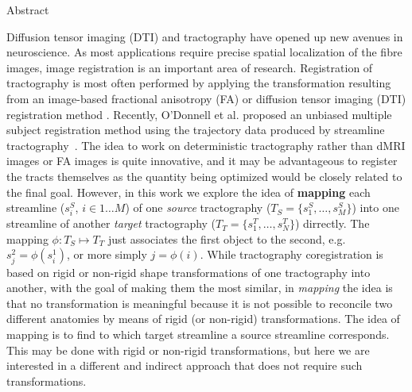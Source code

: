 Abstract

Diffusion tensor imaging (DTI) and tractography have opened up new avenues in neuroscience. As most applications require precise spatial localization of the fibre images, image registration is an important area of research. Registration of tractography is most often performed by applying the
transformation resulting from an image-based fractional anisotropy (FA) or diffusion
tensor imaging (DTI) registration method \cite{goodlett2009group, dan2011comparision, wang2011dti}. Recently, O’Donnell et al. proposed an
unbiased multiple subject registration method using the trajectory data produced by
streamline tractography~\cite{odonnell2012unbiased}. The idea to work on deterministic tractography rather than
dMRI images or FA images is quite innovative, and it may be advantageous to register
the tracts themselves as the quantity being optimized would be closely related to the final
goal. However, in this work we explore the idea of \textbf{mapping} each streamline
($s^S_i$, $i \in 1 \ldots M$) of one \emph{source} tractography ($T_S
= \{s^S_1,\ldots,s^S_M\}$) into one streamline of another
\emph{target} tractography ($T_T = \{s^T_1,\ldots,s^T_N\}$) dirrectly. The
mapping $\phi: T_S \mapsto T_T$ just associates the first object to
the second, e.g. $s^2_j = \phi(s^1_i)$, or more simply $j = \phi(i)$. While tractography
coregistration is based on rigid or non-rigid shape transformations of
one tractography into another, with the goal of making them the most
similar, in \emph{mapping} the idea is that no transformation is
meaningful because it is not possible to reconcile two different
anatomies by means of rigid (or non-rigid) transformations. The idea
of mapping is to find to which target streamline a source streamline
corresponds. This may be done with rigid or non-rigid transformations,
but here we are interested in a different and indirect approach that
does not require such transformations.



